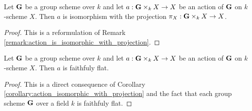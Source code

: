 \begin{corollary}\label{corollary:action_isomorphic_with_projection}
Let $\mathbf{G}$ be a group scheme over $k$ and let $a:\mathbf{G}\times_k X\rightarrow X$ be an action of $\mathbf{G}$ on $k$-scheme $X$. Then $a$ is isomorphism with the projection $\pi_X:\mathbf{G}\times_k X\rightarrow X$.
\end{corollary}
\begin{proof}
This is a reformulation of Remark \ref{remark:action_is_isomorphic_with_projection}.
\end{proof}

\begin{corollary}\label{corollary:action_is_flat}
Let $\mathbf{G}$ be a group scheme over $k$ and let $a:\mathbf{G}\times_k X\rightarrow X$ be an action of $\mathbf{G}$ on $k$-scheme $X$. Then $a$ is faithfuly flat.
\end{corollary}
\begin{proof}
This is a direct consequence of Corollary \ref{corollary:action_isomorphic_with_projection} and the fact that each group scheme $\mathbf{G}$ over a field $k$ is faithfuly flat.
\end{proof}

